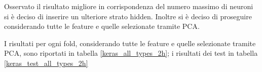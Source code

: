 \documentclass[12pt]{report}
\begin{document}
\begin{table}[H]
\end{table}


Osservato il risultato migliore in corrispondenza del numero massimo di neuroni si è deciso di inserire un ulteriore strato hidden.
Inoltre si è deciso di proseguire considerando tutte le feature e quelle selezionate tramite PCA.

I risultati per ogni fold, considerando tutte le feature e quelle selezionate tramite PCA, sono riportati in tabella \ref{keras_all_types_2h}; i risultati dei test in tabella \ref{keras_test_all_types_2h}

\par\null\par
\end{document}
